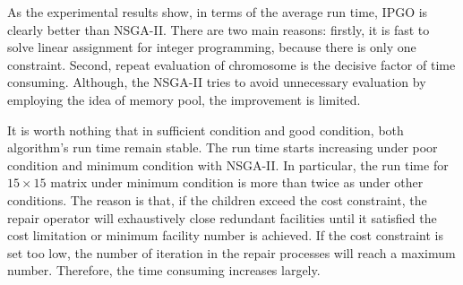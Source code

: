 \documentclass{llncs}
\begin{document}
As the experimental results show, in terms of the average run time, IPGO is clearly better than NSGA-II. 
There are two main reasons: firstly, it is fast to solve linear assignment for integer programming, because there 
is only one constraint. Second, repeat evaluation of chromosome is the decisive factor of time consuming. 
Although, the NSGA-II tries to avoid unnecessary evaluation by employing the idea of memory pool, 
the improvement is limited. 

It is worth nothing that in sufficient condition and good condition, both algorithm's run time remain stable. The run time starts
increasing under poor condition and minimum condition with NSGA-II. In particular, the run time for $15 \times 15$ matrix under 
minimum condition is more than twice as under other conditions.  The reason is that, if the children exceed the cost constraint, 
the repair operator will exhaustively close redundant facilities until it satisfied the cost limitation or minimum facility 
number is achieved. If the cost constraint is set too low, the number of iteration in the repair 
processes will reach a maximum number. Therefore, the time consuming increases largely.
\end{document}
